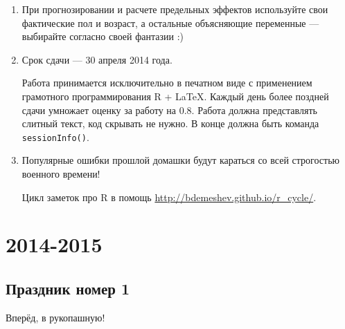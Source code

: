 \documentclass[12pt, a4paper]{article}\usepackage[]{graphicx}\usepackage[]{color}
\begin{document}
\begin{enumerate}
\item При прогнозировании и расчете предельных эффектов используйте свои фактические пол и возраст, а остальные объясняющие переменные — выбирайте согласно своей фантазии :)

\item Срок сдачи — 30 апреля 2014 года.

Работа принимается исключительно в печатном виде с применением грамотного программирования R + \LaTeX. Каждый день более поздней сдачи умножает оценку за работу на $0.8$.  Работа должна представлять слитный текст, код скрывать не нужно. В конце должна быть команда \verb|sessionInfo()|.

\item Популярные ошибки прошлой домашки будут караться со всей строгостью военного времени!

Цикл заметок про R в помощь \url{http://bdemeshev.github.io/r_cycle/}.

\end{enumerate}


\section{2014-2015}

\subsection{Праздник номер 1}

{\Large Вперёд, в рукопашную! }
\end{document}
